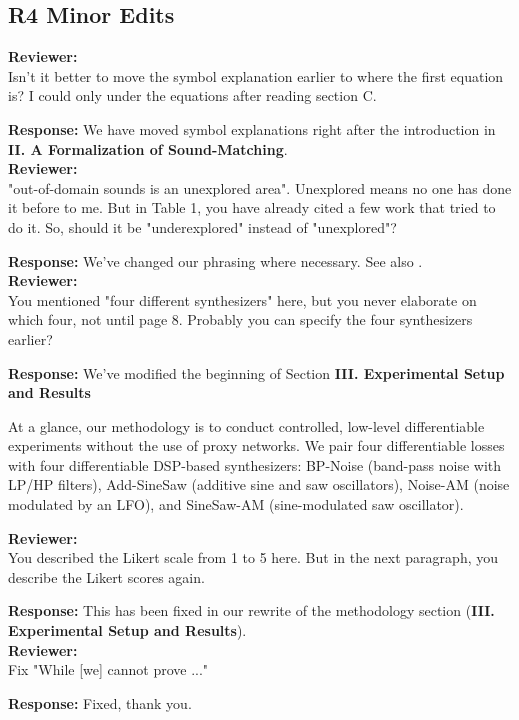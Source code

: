 \documentclass[11pt]{article}
\begin{document}
\subsection{R4 Minor Edits}
\label{r4.minor}
\noindent\textbf{Reviewer:}\\
Isn't it better to move the symbol explanation earlier to where the first equation is? I could only under the equations after reading section C.

\noindent\textbf{Response:}
We have moved symbol explanations right after the introduction in 
\textbf{II. A Formalization of Sound-Matching}. 
\\

\noindent\textbf{Reviewer:}\\
"out-of-domain sounds is an unexplored area". Unexplored means no one has done it before to me. But in Table 1, you have already cited a few work that tried to do it. So, should it be "underexplored" instead of "unexplored"?

\noindent\textbf{Response:}
We've changed our phrasing where necessary. See also .
\\

\noindent\textbf{Reviewer:}\\
You mentioned "four different synthesizers" here, but you never elaborate on which four, not until page 8. Probably you can specify the four synthesizers earlier?

\noindent\textbf{Response:}
We've modified the beginning of Section \textbf{III. Experimental Setup and Results}

\begin{displayquote}
    At a glance, our methodology is to conduct controlled, low-level differentiable experiments without the use of proxy networks. We pair four differentiable losses with four differentiable DSP-based synthesizers: BP-Noise (band-pass noise with LP/HP filters), Add-SineSaw (additive sine and saw oscillators), Noise-AM (noise modulated by an LFO), and SineSaw-AM (sine-modulated saw oscillator). 
\end{displayquote}

\noindent\textbf{Reviewer:}\\
You described the Likert scale from 1 to 5 here. But in the next paragraph, you describe the Likert scores again. 

\noindent\textbf{Response:}
This has been fixed in our rewrite of the methodology section (\textbf{III. Experimental Setup and Results}).
\\

\noindent\textbf{Reviewer:}\\
Fix "While [we] cannot prove ..."

\noindent\textbf{Response:}
Fixed, thank you.
\\




\end{document}
